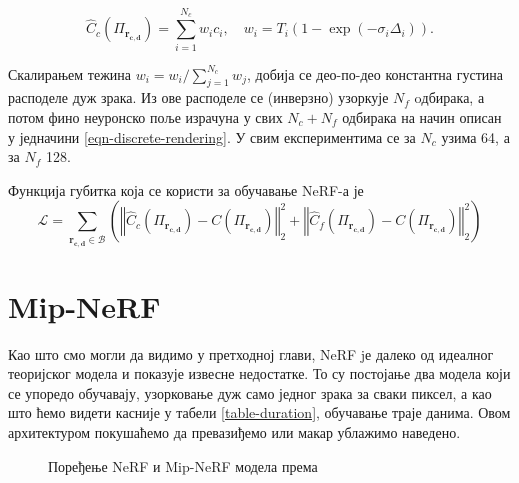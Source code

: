 \documentclass[12pt, a4paper, twoside]{book}
\numberwithin{equation}{chapter}
\numberwithin{theorem}{section}
\numberwithin{definition}{section}
\numberwithin{definitionChapter}{chapter}
\begin{document}
\begin{equation}
	\hat{C}_c(\Pi_{\mathbf{r_{c, d}}}) = \sum_{i=1}^{N_c}w_i c_i, \quad w_i = T_i (1- \exp(-\sigma_i\Delta_i)).
\end{equation}

Скалирањем тежина $w_i = w_i / \sum_{j=1}^{N_c}w_j$, добија се део-по-део константна густина расподеле дуж зрака.
Из ове расподеле се (инверзно) узоркује $N_f$ oдбирака, а потом фино неуронско поље израчуна у свих
$N_c + N_f$ одбирака на начин описан у једначини \ref{eqn-discrete-rendering}. У свим експериментима се
за $N_c$ узима 64, а за $N_f$ 128.

Функција губитка која се користи за обучавање NeRF-а је
\begin{equation}
	\mathcal{L} = \sum_{\mathbf{r_{c, d}} \in \mathcal{B}}
 	\left(
 	\left\Vert \hat{C}_c(\Pi_{\mathbf{r_{c, d}}}) - C(\Pi_{\mathbf{r_{c, d}}}) \right\Vert^2_2 +
	\left\Vert \hat{C}_f(\Pi_{\mathbf{r_{c, d}}}) - C(\Pi_{\mathbf{r_{c, d}}}) \right\Vert^2_2
	\right)
\end{equation}

\section{Mip-NeRF}
Као што смо могли да видимо у претходној глави, NeRF jе далеко од идеалног теоријског модела и
показује извесне недостатке. То су постојање два модела који се упоредо обучавају, узорковање
дуж само једног зрака за сваки пиксел, а као што ћемо видети касније у табели \ref{table-duration},
обучавање траје данима. Овом архитектуром покушаћемо да превазиђемо или макар ублажимо наведено.

\begin{figure}[H]
	\begin{center}
	\end{center}
	\caption{Поређење NeRF и Mip-NeRF модела према \cite{mip-nerf}}
	\label{fig-nerf-vs-mipnerf}
\end{figure}
\end{document}
